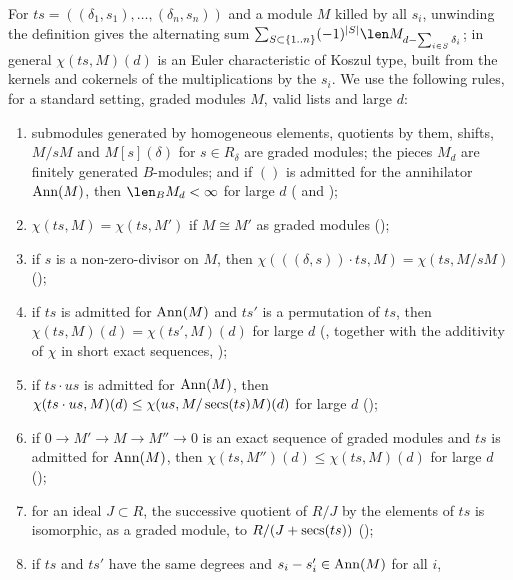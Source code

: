 For $ts=((\delta_1,s_1),\dots,(\delta_n,s_n))$ and a module $M$ killed by all $s_i$, unwinding the definition gives the
alternating sum $\sum_{S\subset\{1..n\}}(-1)^{|S|}\len M_{d-\sum_{i\in S}\delta_i}$; in general $\chi(ts,M)(d)$ is an
Euler characteristic of Koszul type, built from the kernels and cokernels of the multiplications by the $s_i$. We use
the following rules, for a standard setting, graded modules $M$, valid lists and large $d$:
\begin{enumerate}[label=(E\arabic*)]
\item\label{pf:vwin-he:E-gr} submodules generated by homogeneous elements, quotients by them, shifts, $M/sM$ and
$M[s](\delta)$ for $s\in R_\delta$ are graded modules; the pieces $M_d$ are finitely generated $B$-modules; and if
$()$ is admitted for the annihilator $\operatorname{Ann}(M)$, then $\len_BM_d<\infty$ for large $d$
( and );
\item\label{pf:vwin-he:E-iso} $\chi(ts,M)=\chi(ts,M')$ if $M\cong M'$ as graded modules
();
\item\label{pf:vwin-he:E-nzd} if $s$ is a non-zero-divisor on $M$, then $\chi(((\delta,s))\cdot ts,M)=\chi(ts,M/sM)$
();
\item\label{pf:vwin-he:E-perm} if $ts$ is admitted for $\operatorname{Ann}(M)$ and $ts'$ is a permutation of $ts$, then
$\chi(ts,M)(d)=\chi(ts',M)(d)$ for large $d$
(, together with the additivity of
$\chi$ in short exact sequences, );
\item\label{pf:vwin-he:E-ub} if $ts\cdot us$ is admitted for $\operatorname{Ann}(M)$, then $\chi(ts\cdot us,M)(d)\le
\chi(us,M/\operatorname{secs}(ts)M)(d)$ for large $d$ ();
\item\label{pf:vwin-he:E-mono} if $0\to M'\to M\to M''\to0$ is an exact sequence of graded modules and $ts$ is admitted
for $\operatorname{Ann}(M)$, then $\chi(ts,M'')(d)\le\chi(ts,M)(d)$ for large $d$
();
\item\label{pf:vwin-he:E-quot} for an ideal $J\subset R$, the successive quotient of $R/J$ by the elements of $ts$ is
isomorphic, as a graded module, to $R/(J+\operatorname{secs}(ts))$
();
\item\label{pf:vwin-he:E-cong} if $ts$ and $ts'$ have the same degrees and $s_i-s'_i\in\operatorname{Ann}(M)$ for all $i$,

\end{enumerate}
